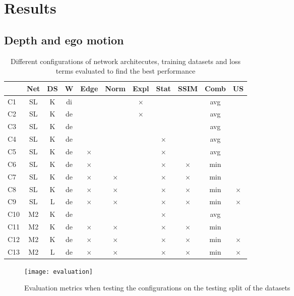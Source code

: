 \chapter{Results}\label{cha:results}

\section{Depth and ego motion}

\begin{table}[H]
\begin{tabular}{|l|c|c|c|c|c|c|c|c|c|c|}
\hline
 & Net & DS & W & Edge & Norm & Expl & Stat & SSIM & Comb & US \\
\hline
C1 & SL & K & di &  &  & $ \times $ &  &  & avg &  \\
\hline
C2 & SL & K & de &  &  & $ \times $ &  &  & avg &  \\
\hline
C3 & SL & K & de &  &  &  &  &  & avg &  \\
\hline
C4 & SL & K & de &  &  &  & $ \times $ &  & avg &  \\
\hline
C5 & SL & K & de & $ \times $ &  &  & $ \times $ &  & avg &  \\
\hline
C6 & SL & K & de & $ \times $ &  &  & $ \times $ & $ \times $ & min &  \\
\hline
C7 & SL & K & de & $ \times $ & $ \times $ &  & $ \times $ & $ \times $ & min &  \\
\hline
C8 & SL & K & de & $ \times $ & $ \times $ &  & $ \times $ & $ \times $ & min & $ \times $ \\
\hline
C9 & SL & L & de & $ \times $ & $ \times $ &  & $ \times $ & $ \times $ & min & $ \times $ \\
\hline
C10 & M2 & K & de &  &  &  & $ \times $ &  & avg &  \\
\hline
C11 & M2 & K & de & $ \times $ & $ \times $ &  & $ \times $ & $ \times $ & min &  \\
\hline
C12 & M2 & K & de & $ \times $ & $ \times $ &  & $ \times $ & $ \times $ & min & $ \times $ \\
\hline
C13 & M2 & L & de & $ \times $ & $ \times $ &  & $ \times $ & $ \times $ & min & $ \times $ \\
\hline
\end{tabular}
\caption{Different configurations of network architecutes, training datasets and loss terms evaluated to find the best performance}
\label{table:configurations}
\end{table}

\begin{figure}[H]
	\centering
	\texttt{[image: evaluation]}
	\caption{Evaluation metrics when testing the configurations on the testing split of the datasets}
	\label{fig:evaluation}
\end{figure}

